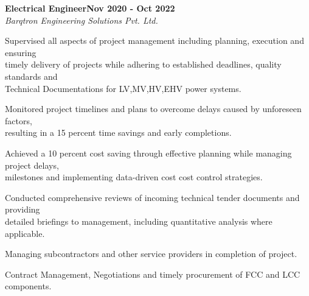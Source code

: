 \documentclass[letterpaper,10pt]{article}
\newcommand{\heading}[2]{
  \hspace{10pt}#1\hfill#2\\
}
\newcommand{\headingBf}[2]{
  \heading{\textbf{#1}}{\textbf{#2}}
}
\newcommand{\headingIt}[2]{
  \heading{\textit{#1}}{\textit{#2}}
}
\newenvironment{resume_list}{
  \vspace{-7pt}
  \begin{itemize}[itemsep=-2px, parsep=1pt, leftmargin=30pt]
}{
  \end{itemize}
}
\begin{document}
\headingBf{Electrical Engineer}{Nov 2020 - Oct 2022}
\headingIt{Barqtron Engineering Solutions Pvt. Ltd.}{}
\begin{resume_list}
    \item Supervised all aspects of project management including planning, execution and ensuring \\timely delivery of projects while adhering to established deadlines, quality standards and \\Technical Documentations for LV,MV,HV,EHV power systems.
    \item Monitored project timelines and plans to overcome delays caused by unforeseen factors,\\resulting in a 15 percent time savings and early completions.
    \item Achieved a 10 percent cost saving through effective planning while managing project delays,\\ milestones and implementing data-driven cost cost control strategies.
    \item Conducted comprehensive reviews of incoming technical tender documents and providing \\detailed briefings to management, including quantitative analysis where applicable.
    \item Managing subcontractors and other service providers in completion of project.
    \item Contract Management, Negotiations and timely procurement of FCC and LCC components.
    \vspace{10pt}
\end{resume_list}
\end{document}
